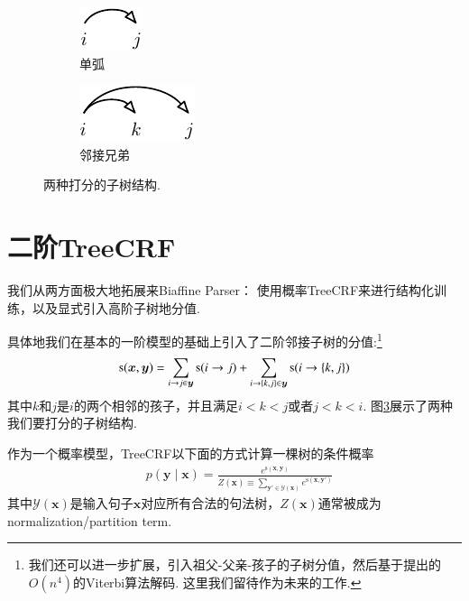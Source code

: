 \begin{figure}[tb]
    \centering
    \begin{subfigure}[b]{0.45\textwidth}
        \centering
        \includegraphics[scale=1.5]{figures/scoring-part/arc.pdf}
        \caption{单弧}
        \label{fig:scoring-part-arc}
    \end{subfigure}
    \begin{subfigure}[b]{0.45\textwidth}
        \centering
        \includegraphics[scale=1.5]{figures/scoring-part/sib.pdf}
        \caption{邻接兄弟}
        \label{fig:scoring-part-sib}
    \end{subfigure}
    \caption{两种打分的子树结构.}
    \label{fig:scoring-part}
\end{figure}



\section{二阶TreeCRF}\label{2o-tree-crf}
我们从两方面极大地拓展来Biaffine Parser：
使用概率TreeCRF来进行结构化训练，以及显式引入高阶子树地分值.

具体地我们在基本的一阶模型的基础上引入了二阶邻接子树的分值:\footnote{
    我们还可以进一步扩展，引入祖父-父亲-孩子的子树分值，然后基于\cite{koo-collins-2010-efficient}提出的$O(n^4)$的Viterbi算法解码.
    这里我们留待作为未来的工作.
}
\begin{equation}\label{eq:score-definition-2o}
    \mathrm{s}(\boldsymbol{x}, \boldsymbol{y}) = \sum_{i\rightarrow j \in \boldsymbol{y}}\mathrm{s}(i\rightarrow j) + \sum_{
        i\rightarrow \{k,j\} \in \boldsymbol{y} %
    } \mathrm{s}(i\rightarrow \{k,j\})
\end{equation}
其中$k$和$j$是$i$的两个相邻的孩子，并且满足$i < k < j$或者$j < k < i$.
图\ref{fig:scoring-part}展示了两种我们要打分的子树结构.

作为一个概率模型，TreeCRF以下面的方式计算一棵树的条件概率
\begin{equation}\label{eq:prob-labeled}
    \begin{split}
        & p(\boldsymbol{y}\mid\boldsymbol{x})  = \frac{e^{\mathrm{s}(\boldsymbol{x},\boldsymbol{y})}}{Z(\boldsymbol{x}) \equiv \sum_{\boldsymbol{y'} \in \mathcal{Y}(\boldsymbol{x})} {e^{\mathrm{s}(\boldsymbol{x},\boldsymbol{y'})}}}
    \end{split}
\end{equation}
其中$\mathcal{Y}(\boldsymbol{x})$是输入句子$\boldsymbol{x}$对应所有合法的句法树，$Z(\boldsymbol{x})$通常被成为normalization/partition term.

